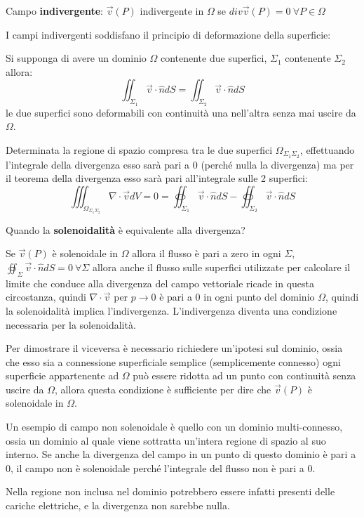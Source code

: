 Campo \textbf{indivergente}: $\vec{v}(P)$ indivergente in $\Omega$ se $div \vec{v}(P) = 0 \ \forall P \in \Omega$

I campi indivergenti soddisfano il principio di deformazione della superficie:

Si supponga di avere un dominio $\Omega$ contenente due superfici, $\Sigma_1$ contenente $\Sigma_2$
allora:
$$
\iint_{\Sigma_1} \vec{v}\cdot\hat{n}dS = \iint_{\Sigma_2}\vec{v}\cdot\hat{n}dS 
$$
le due superfici sono deformabili con continuità una nell'altra senza mai uscire da $\Omega$.

Determinata la regione di spazio compresa tra le due superfici $\Omega_{\Sigma_1\Sigma_2}$,
effettuando l'integrale della divergenza esso sarà pari a 0 (perché nulla la divergenza) ma per 
il teorema della divergenza esso sarà pari all'integrale sulle 2 superfici:
$$
\iiint_{\Omega_{\Sigma_1\Sigma_2}} \nabla\cdot\vec{v}dV = 0 = \oiint_{\Sigma_1}\vec{v}\cdot\hat{n}dS - \oiint_{\Sigma_2}\vec{v}\cdot\hat{n}dS
$$

Quando la \textbf{solenoidalità} è equivalente alla divergenza?

Se $\vec{v}(P)$ è solenoidale in $\Omega$ allora il flusso è pari a zero in ogni $\Sigma$, $\oiint_\Sigma \vec{v}\cdot\hat{n}dS = 0 \ \forall \Sigma $ allora
anche il flusso sulle superfici utilizzate per calcolare il limite che conduce alla divergenza del campo vettoriale ricade in questa circostanza, quindi $\nabla\cdot\vec{v}$ per $p\to 0$ è pari a 0 in ogni punto
del dominio $\Omega$, quindi la solenoidalità implica l'indivergenza.
L'indivergenza diventa una condizione necessaria per la solenoidalità.

Per dimostrare il viceversa è necessario richiedere un'ipotesi sul dominio, ossia che esso sia
a connessione superficiale semplice (semplicemente connesso)
ogni superficie appartenente ad $\Omega$ può essere ridotta ad un punto con continuità senza uscire da $\Omega$,
allora questa condizione è sufficiente per dire che $\vec{v}(P)$ è solenoidale in $\Omega$.

Un esempio di campo non solenoidale è quello con un dominio multi-connesso, ossia un dominio
al quale viene sottratta un'intera regione di spazio al suo interno.
Se anche la divergenza del campo in un punto di questo dominio è pari a 0, il campo non è 
solenoidale perché l'integrale del flusso non è pari a 0.

Nella regione non inclusa nel dominio potrebbero essere infatti presenti delle cariche
elettriche, e la divergenza non sarebbe nulla.
